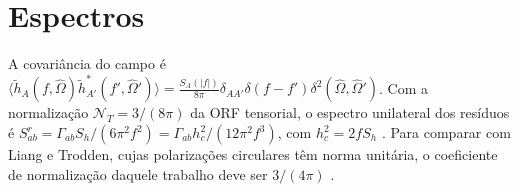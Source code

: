 \section{Espectros}

A covariância do campo é
$\langle\tilde h_A(f,\hat\Omega)\tilde h_{A'}^*(f',\hat\Omega')\rangle
=\frac{S_A(|f|)}{8\pi}\delta_{AA'}\delta(f-f')\delta^2(\hat\Omega,\hat\Omega')$.
Com a normalização $\mathcal N_T=3/(8\pi)$ da ORF tensorial, o espectro
unilateral dos resíduos é
$S^r_{ab}=\Gamma_{ab}S_h/(6\pi^2f^2)=\Gamma_{ab}h_c^2/(12\pi^2f^3)$, com
$h_c^2=2fS_h$ \autocite{cordes2025}. Para comparar com Liang e Trodden,
cujas polarizações circulares têm norma unitária, o coeficiente de
normalização daquele trabalho deve ser $3/(4\pi)$ \autocite{liang2021}.
